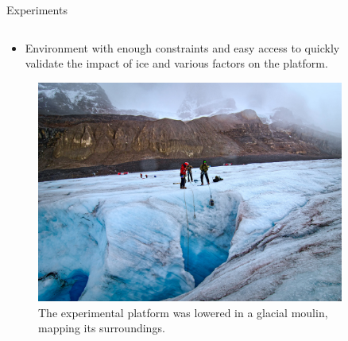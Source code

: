\documentclass[final,hyperref={pdfpagelabels=false}]{beamer}
\begin{document}
\begin{frame}[t]
\begin{columns}[t]
\begin{column}{.465\textwidth}
\begin{block}{Experiments}
\begin{columns}
\begin{column}{.5\textwidth}
\begin{itemize}
\begin{itemize}
					\item Environment with enough constraints and easy access to quickly validate the impact of ice and various factors on the platform.
				\end{itemize}
			\end{itemize}
			\centering
			\begin{figure}
				\includegraphics[width=0.95\linewidth]{figures/sphere_moulin_improved_small.jpg}
				\caption{The experimental platform was lowered in a glacial moulin, mapping its surroundings.}
			\end{figure}
		\end{column}
	\end{columns} %
\end{block}


\end{column} %

\begin{column}{.03\textwidth}\end{column} %
 
\begin{column}{.465\textwidth} %
	


\end{column}
\end{columns}
\end{frame}
\end{document}
